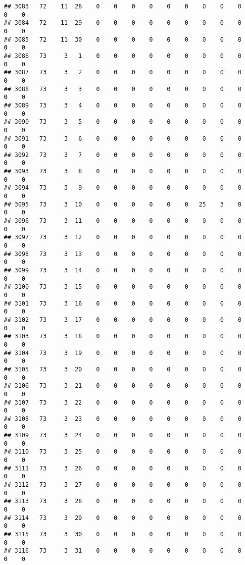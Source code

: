 \documentclass[]{article}
\begin{document}
\begin{verbatim}
## 3083   72    11  28    0    0    0    0    0    0    0    0    0    0    0
## 3084   72    11  29    0    0    0    0    0    0    0    0    0    0    0
## 3085   72    11  30    0    0    0    0    0    0    0    0    0    0    0
## 3086   73     3   1    0    0    0    0    0    0    0    0    0    0    0
## 3087   73     3   2    0    0    0    0    0    0    0    0    0    0    0
## 3088   73     3   3    0    0    0    0    0    0    0    0    0    0    0
## 3089   73     3   4    0    0    0    0    0    0    0    0    0    0    0
## 3090   73     3   5    0    0    0    0    0    0    0    0    0    0    0
## 3091   73     3   6    0    0    0    0    0    0    0    0    0    0    0
## 3092   73     3   7    0    0    0    0    0    0    0    0    0    0    0
## 3093   73     3   8    0    0    0    0    0    0    0    0    0    0    0
## 3094   73     3   9    0    0    0    0    0    0    0    0    0    0    0
## 3095   73     3  10    0    0    0    0    0    0   25    3    0    0    0
## 3096   73     3  11    0    0    0    0    0    0    0    0    0    0    0
## 3097   73     3  12    0    0    0    0    0    0    0    0    0    0    0
## 3098   73     3  13    0    0    0    0    0    0    0    0    0    0    0
## 3099   73     3  14    0    0    0    0    0    0    0    0    0    0    0
## 3100   73     3  15    0    0    0    0    0    0    0    0    0    0    0
## 3101   73     3  16    0    0    0    0    0    0    0    0    0    0    0
## 3102   73     3  17    0    0    0    0    0    0    0    0    0    0    0
## 3103   73     3  18    0    0    0    0    0    0    0    0    0    0    0
## 3104   73     3  19    0    0    0    0    0    0    0    0    0    0    0
## 3105   73     3  20    0    0    0    0    0    0    0    0    0    0    0
## 3106   73     3  21    0    0    0    0    0    0    0    0    0    0    0
## 3107   73     3  22    0    0    0    0    0    0    0    0    0    0    0
## 3108   73     3  23    0    0    0    0    0    0    0    0    0    0    0
## 3109   73     3  24    0    0    0    0    0    0    0    0    0    0    0
## 3110   73     3  25    0    0    0    0    0    0    0    0    0    0    0
## 3111   73     3  26    0    0    0    0    0    0    0    0    0    0    0
## 3112   73     3  27    0    0    0    0    0    0    0    0    0    0    0
## 3113   73     3  28    0    0    0    0    0    0    0    0    0    0    0
## 3114   73     3  29    0    0    0    0    0    0    0    0    0    0    0
## 3115   73     3  30    0    0    0    0    0    0    0    0    0    0    0
## 3116   73     3  31    0    0    0    0    0    0    0    0    0    0    0

\end{verbatim}
\end{document}
